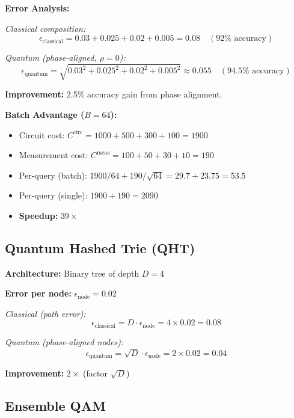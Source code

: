 \documentclass[11pt]{article}
\begin{document}
\textbf{Error Analysis:}

\textit{Classical composition:}
\begin{equation}
\epsilon_{\text{classical}} = 0.03 + 0.025 + 0.02 + 0.005 = 0.08 \quad (92\% \text{ accuracy})
\end{equation}

\textit{Quantum (phase-aligned, $\rho=0$):}
\begin{equation}
\epsilon_{\text{quantum}} = \sqrt{0.03^2 + 0.025^2 + 0.02^2 + 0.005^2} \approx 0.055 \quad (94.5\% \text{ accuracy})
\end{equation}

\textbf{Improvement:} 2.5\% accuracy gain from phase alignment.

\textbf{Batch Advantage ($B=64$):}
\begin{itemize}
\item Circuit cost: $C^{\text{circ}} = 1000 + 500 + 300 + 100 = 1900$
\item Measurement cost: $C^{\text{meas}} = 100 + 50 + 30 + 10 = 190$
\item Per-query (batch): $1900/64 + 190/\sqrt{64} = 29.7 + 23.75 = 53.5$
\item Per-query (single): $1900 + 190 = 2090$
\item \textbf{Speedup:} $39\times$
\end{itemize}

\subsection{Quantum Hashed Trie (QHT)}

\textbf{Architecture:} Binary tree of depth $D=4$

\textbf{Error per node:} $\epsilon_{\text{node}} = 0.02$

\textit{Classical (path error):}
\begin{equation}
\epsilon_{\text{classical}} = D \cdot \epsilon_{\text{node}} = 4 \times 0.02 = 0.08
\end{equation}

\textit{Quantum (phase-aligned nodes):}
\begin{equation}
\epsilon_{\text{quantum}} = \sqrt{D} \cdot \epsilon_{\text{node}} = 2 \times 0.02 = 0.04
\end{equation}

\textbf{Improvement:} $2\times$ (factor $\sqrt{D}$)

\subsection{Ensemble QAM}
\end{document}
